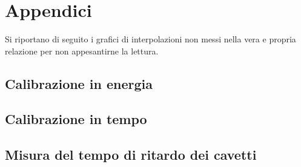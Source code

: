 \section{Appendici}
Si riportano di seguito i grafici di interpolazioni non messi nella vera e propria relazione per non appesantirne la lettura.
\subsection{Calibrazione in energia}





\FloatBarrier
\subsection{Calibrazione in tempo}







\FloatBarrier
\subsection{Misura del tempo di ritardo dei cavetti}



%
%
%
%
%
%
%
%
%
%
%
%
%
%
%
%
%
%